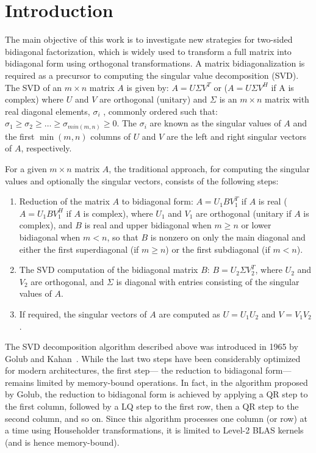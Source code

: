 \section{Introduction}
The main objective of this work is to investigate new strategies for
two-sided bidiagonal factorization,
which is widely used to
transform a full matrix into bidiagonal form using orthogonal transformations.
A matrix bidiagonalization is required as a precursor to computing the
singular value decomposition (SVD).
The SVD of an $m\times n$ matrix $A$ is given by:
$A = U \Sigma V^T$ or ($A = U \Sigma V^H$ if A is complex) where
$U$ and $V$ are orthogonal (unitary) and $\Sigma$ is an $m\times n$
matrix with real diagonal elements, $\sigma_i$ , commonly ordered such
that: $\sigma_1 \ge \sigma_2 \ge \dots \ge \sigma_{min(m,n)} \ge 0.$
The $\sigma_i$ are known as the singular values of $A$
and the first $\min(m, n)$ columns
of $U$ and $V$ are the left and right singular vectors of $A$, respectively.

For a given $m\times n$ matrix $A$,
the traditional approach, for computing the singular
values and optionally the singular vectors,
consists of the following steps:
\begin{enumerate}
\item Reduction of the matrix $A$ to bidiagonal form: $A =
  U_1BV^T_1$ if $A$ is real ($A = U_1BV^H_1$ if $A$ is complex), where
  $U_1$ and $V_1$ are orthogonal (unitary if $A$ is complex), and $B$ is
  real and upper bidiagonal when $m \ge n$ or lower bidiagonal when $m < n$,
  so that $B$ is nonzero on only the main diagonal and either the first
  superdiagonal (if $m \ge n$) or the first subdiagonal (if $m < n$).

\item The SVD computation of the bidiagonal matrix $B$: $B = U_2 \Sigma
  V_2^T$, where $U_2$ and $V_2$ are orthogonal, and $\Sigma$ is
  diagonal with entries consisting of the singular values of $A$.
\item If required, the singular vectors of $A$ are computed as
  $U = U_1U_2$ and $V = V_1 V_2$.
\end{enumerate}

The SVD decomposition algorithm described above was introduced in
1965 by Golub and Kahan~\cite{golub1965calculating}.
While the last two steps have been considerably optimized
for modern architectures,
the first step---%
the reduction to bidiagonal form---%
remains limited by
memory-bound operations.
In fact, in the algorithm proposed by Golub,
the reduction to bidiagonal form is achieved by applying a QR step to
the first column, followed by a LQ step to the first row, then a QR
step to the second column, and so on. Since this algorithm processes
one column (or row) at a time using Householder transformations,
it is limited to Level-2 BLAS kernels (and is hence memory-bound).

